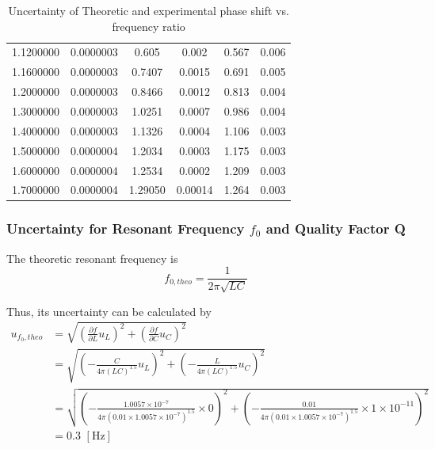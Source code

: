 \documentclass[a4paper]{article}
\begin{document}
\begin{table}[!htbp]
\begin{tabular}{cccccc}
		1.1200000 & 0.0000003   & 0.605                   & 0.002                       & 0.567                 & 0.006                     \\
		1.1600000 & 0.0000003   & 0.7407                  & 0.0015                      & 0.691                 & 0.005                     \\
		1.2000000 & 0.0000003   & 0.8466                  & 0.0012                      & 0.813                 & 0.004                     \\
		1.3000000 & 0.0000003   & 1.0251                  & 0.0007                      & 0.986                 & 0.004                     \\
		1.4000000 & 0.0000003   & 1.1326                  & 0.0004                      & 1.106                 & 0.003                     \\
		1.5000000 & 0.0000004   & 1.2034                  & 0.0003                      & 1.175                 & 0.003                     \\
		1.6000000 & 0.0000004   & 1.2534                  & 0.0002                      & 1.209                 & 0.003                     \\
		1.7000000 & 0.0000004   & 1.29050                 & 0.00014                     & 1.264                 & 0.003                     \\
		\hline
	\end{tabular}%
	\caption{Uncertainty of Theoretic and experimental phase shift vs. frequency ratio}
	\label{table::phase_shift}
\end{table}

\subsubsection{Uncertainty for Resonant Frequency $f_0$ and Quality Factor Q}

The theoretic resonant frequency is
$$f_{0,theo}=\frac{1}{2\pi \sqrt{LC}}$$

Thus, its uncertainty can be calculated by
\begin{align*}
	u_{f_0,theo}
	 & = \sqrt{(\frac{\partial f}{\partial L}u_{L})^2+(\frac{\partial f}{\partial C}u_{C})^2}                                                                                                  \\
	 & = \sqrt{(-\frac{C}{4\pi (LC)^{1.5}} u_{L})^2+(-\frac{L}{4\pi (LC)^{1.5}} u_{C})^2}                                                                                                      \\
	 & = \sqrt{(-\frac{1.0057\times 10^{-7}}{4\pi (0.01\times 1.0057\times 10^{-7})^{1.5}} \times 0)^2+(-\frac{0.01}{4\pi (0.01\times 1.0057\times 10^{-7})^{1.5}} \times 1\times 10^{-11})^2} \\
	 & = 0.3\,\,[\text{Hz}]
\end{align*}
\end{document}
